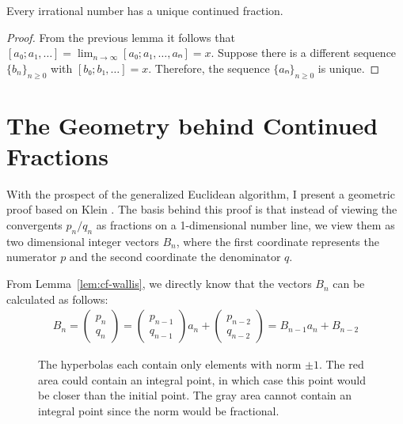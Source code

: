 \begin{theorem}
  \label{thm:irrat-cf}
  Every irrational number has a unique continued fraction.
\end{theorem}

\begin{proof}
  From the previous lemma it follows that $[a₀; a₁, …] = \lim_{n → ∞} [a₀; a₁, …, aₙ] = x$.
  Suppose there is a different sequence $\{b_n\}_{n ≥ 0}$ with $[b₀; b₁, …] = x$.
  Therefore, the sequence $\{aₙ\}_{n ≥ 0}$ is unique.
\end{proof}

\section{The Geometry behind Continued Fractions}

With the prospect of the generalized Euclidean algorithm, I present a geometric
proof based on Klein \cite{Klein95}.
The basis behind this proof is that instead of viewing the convergents $p_n/q_n$ as
fractions on a 1-dimensional number line,
we view them as two dimensional integer vectors $B_n$, where the first coordinate
represents the numerator $p$ and the second coordinate the denominator $q$.

From Lemma~\ref{lem:cf-wallis},
we directly know that the vectors $B_n$ can be calculated as follows:
\begin{align*}
  B_n =
  \begin{pmatrix}
    p_n \\ q_n
  \end{pmatrix}
  =
  \begin{pmatrix}
    p_{n-1} \\ q_{n-1}
  \end{pmatrix}
  a_n
  +
  \begin{pmatrix}
    p_{n-2} \\ q_{n-2}
  \end{pmatrix}
  = B_{n-1} a_n + B_{n-2}
\end{align*}

\begin{figure}[tb]
  \centering
  
  \caption{
    The hyperbolas each contain only elements with norm $±1$.
    The red area could contain an integral point, in which case this point
    would be closer than the initial point.
    The gray area cannot contain an integral point since the norm would be
    fractional.
  }
\end{figure}

